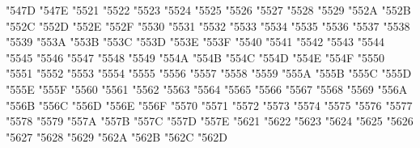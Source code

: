 {\Uchar\jis"547D %
\Uchar\jis"547E %
\Uchar\jis"5521 %
\Uchar\jis"5522 %
\Uchar\jis"5523 %
\Uchar\jis"5524 %
\Uchar\jis"5525 %
\Uchar\jis"5526 %
\Uchar\jis"5527 %
\Uchar\jis"5528 %
\Uchar\jis"5529 %
\Uchar\jis"552A %
\Uchar\jis"552B %
\Uchar\jis"552C %
\Uchar\jis"552D %
\Uchar\jis"552E %
\Uchar\jis"552F %
\Uchar\jis"5530 %
\Uchar\jis"5531 %
\Uchar\jis"5532 %
\Uchar\jis"5533 %
\Uchar\jis"5534 %
\Uchar\jis"5535 %
\Uchar\jis"5536 %
\Uchar\jis"5537 %
\Uchar\jis"5538 %
\Uchar\jis"5539 %
\Uchar\jis"553A %
\Uchar\jis"553B %
\Uchar\jis"553C %
\Uchar\jis"553D %
\Uchar\jis"553E %
\Uchar\jis"553F %
\Uchar\jis"5540 %
\Uchar\jis"5541 %
\Uchar\jis"5542 %
\Uchar\jis"5543 %
\Uchar\jis"5544 %
\Uchar\jis"5545 %
\Uchar\jis"5546 %
\Uchar\jis"5547 %
\Uchar\jis"5548 %
\Uchar\jis"5549 %
\Uchar\jis"554A %
\Uchar\jis"554B %
\Uchar\jis"554C %
\Uchar\jis"554D %
\Uchar\jis"554E %
\Uchar\jis"554F %
\Uchar\jis"5550 %
\Uchar\jis"5551 %
\Uchar\jis"5552 %
\Uchar\jis"5553 %
\Uchar\jis"5554 %
\Uchar\jis"5555 %
\Uchar\jis"5556 %
\Uchar\jis"5557 %
\Uchar\jis"5558 %
\Uchar\jis"5559 %
\Uchar\jis"555A %
\Uchar\jis"555B %
\Uchar\jis"555C %
\Uchar\jis"555D %
\Uchar\jis"555E %
\Uchar\jis"555F %
\Uchar\jis"5560 %
\Uchar\jis"5561 %
\Uchar\jis"5562 %
\Uchar\jis"5563 %
\Uchar\jis"5564 %
\Uchar\jis"5565 %
\Uchar\jis"5566 %
\Uchar\jis"5567 %
\Uchar\jis"5568 %
\Uchar\jis"5569 %
\Uchar\jis"556A %
\Uchar\jis"556B %
\Uchar\jis"556C %
\Uchar\jis"556D %
\Uchar\jis"556E %
\Uchar\jis"556F %
\Uchar\jis"5570 %
\Uchar\jis"5571 %
\Uchar\jis"5572 %
\Uchar\jis"5573 %
\Uchar\jis"5574 %
\Uchar\jis"5575 %
\Uchar\jis"5576 %
\Uchar\jis"5577 %
\Uchar\jis"5578 %
\Uchar\jis"5579 %
\Uchar\jis"557A %
\Uchar\jis"557B %
\Uchar\jis"557C %
\Uchar\jis"557D %
\Uchar\jis"557E %
\Uchar\jis"5621 %
\Uchar\jis"5622 %
\Uchar\jis"5623 %
\Uchar\jis"5624 %
\Uchar\jis"5625 %
\Uchar\jis"5626 %
\Uchar\jis"5627 %
\Uchar\jis"5628 %
\Uchar\jis"5629 %
\Uchar\jis"562A %
\Uchar\jis"562B %
\Uchar\jis"562C %
\Uchar\jis"562D %
}
